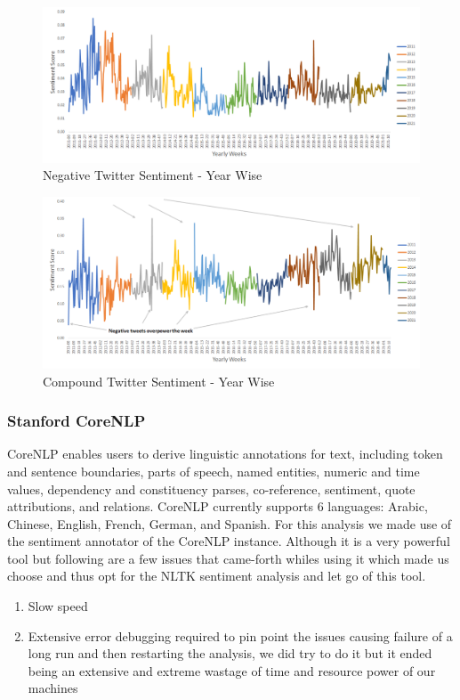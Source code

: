 \documentclass[sigconf, nonacm]{acmart}
\begin{document}
\begin{figure}[H]
  \centering
  \includegraphics[width=\linewidth]{neg_sent_raw.png}
  \caption{Negative Twitter Sentiment - Year Wise}
\end{figure}

\begin{figure}[H]
  \centering
  \includegraphics[width=\linewidth]{comp_sent.png}
  \caption{Compound Twitter Sentiment - Year Wise}
\end{figure}




\subsubsection{Stanford CoreNLP}
CoreNLP enables users to derive linguistic annotations for text, including token and sentence boundaries, parts of speech, named entities, numeric and time values, dependency and constituency parses, co-reference, sentiment, quote attributions, and relations. CoreNLP currently supports 6 languages: Arabic, Chinese, English, French, German, and Spanish. For this analysis we made use of the sentiment annotator of the CoreNLP instance. Although it is a very powerful tool but following are a few issues that came-forth whiles using it which  made us choose and thus opt for the NLTK sentiment analysis and let go of this tool.
\begin{enumerate}
    \item Slow speed
    \item Extensive error debugging required to pin point the issues causing failure of a long run and then restarting the analysis, we did try to do it but it ended being an extensive and extreme wastage of time and resource power of our machines
\end{enumerate}
\end{document}
